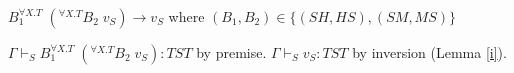\begin{case}
$B_{1}^{\forall X.T}\;(^{\forall X.T}B_{2}\;v_{S})\rightarrow v_{S}$ where $(B_{1},B_{2})\in\lbrace(SH,HS),(SM,MS)\rbrace$

$\Gamma\vdash_{S}B_{1}^{\forall X.T}\;(^{\forall X.T}B_{2}\;v_{S}):TST$ by premise.  $\Gamma\vdash_{S}v_{S}:TST$ by inversion (Lemma \ref{i}).
\end{case}